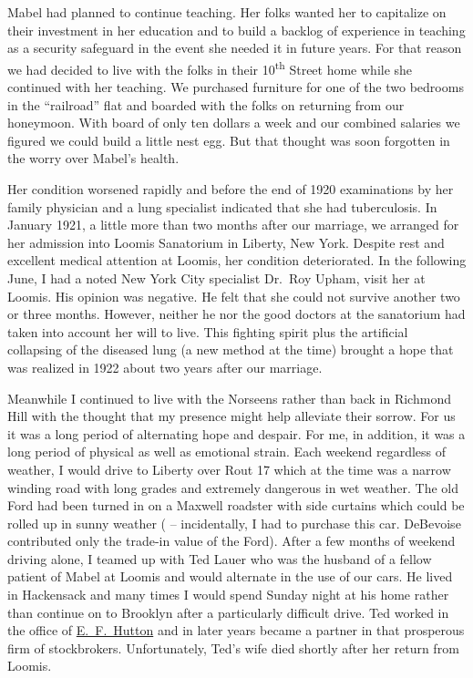 \documentclass[12pt]{book}              %
\begin{document}
Mabel had planned to continue teaching. Her folks wanted her to capitalize on their investment in her education and to build a backlog of experience in teaching as a security safeguard in the event she needed it in future years. For that reason we had decided to live with the folks in their 10\textsuperscript{th} Street home while she continued with her teaching. We purchased furniture for one of the two bedrooms in the ``railroad'' flat and boarded with the folks on returning from our honeymoon. With board of only ten dollars a week and our combined salaries we figured we could build a little nest egg. But that thought was soon forgotten in the worry over Mabel's health. 

Her condition worsened rapidly and before the end of 1920 examinations by her family physician and a lung specialist indicated that she had tuberculosis. In January 1921, a little more than two months after our marriage, we arranged for her admission into Loomis Sanatorium in Liberty, New York. Despite rest and excellent medical attention at Loomis, her condition deteriorated. In the following June, I had a noted New York City specialist Dr.~Roy Upham, visit her at Loomis. His opinion was negative. He felt that she could not survive another two or three months. However, neither he nor the good doctors at the sanatorium had taken into account her will to live. This fighting spirit plus the artificial collapsing of the diseased lung (a new method at the time) brought a hope that was realized in 1922 about two years after our marriage. 

Meanwhile I continued to live with the Norseens rather than back in Richmond Hill with the thought that my presence might help alleviate their sorrow. For us it was a long period of alternating hope and despair. For me, in addition, it was a long period of physical as well as emotional strain. Each weekend regardless of weather, I would drive to Liberty over Rout 17 which at the time was a narrow winding road with long grades and extremely dangerous in wet weather. The old Ford had been turned in on a Maxwell roadster with side curtains which could be rolled up in sunny weather ( -- incidentally, I had to purchase this car. DeBevoise contributed only the trade-in value of the Ford). After a few months of weekend driving alone, I teamed up with Ted Lauer who was the husband of a fellow patient of Mabel at Loomis and would alternate in the use of our cars. He lived in Hackensack and many times I would spend Sunday night at his home rather than continue on to Brooklyn after a particularly difficult drive. Ted worked in the office of \href{http://en.wikipedia.org/wiki/E._F._Hutton_\%26_Co.}{E.~F.~Hutton} and in later years became a partner in that prosperous firm of stockbrokers. Unfortunately, Ted's wife died shortly after her return from Loomis. 
\end{document}
